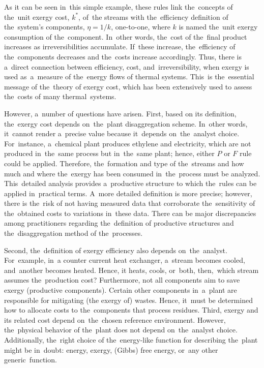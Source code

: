 \documentclass[energies,article,accept,moreauthors,pdftex]{Definitions/mdpi}
\begin{document}
As it can be seen in~this simple example, these rules link the~concepts of the~unit exergy cost, $k^*$, of~the streams with the~efficiency definition of the~system's components, $\eta= 1/k$, one-to-one, where $k$ is named the~unit exergy consumption of the~component. In~other words, the~cost of the~final product increases as irreversibilities accumulate. If~these increase, the~efficiency of the~components decreases and the~costs increase accordingly. Thus, there is a~direct connection between efficiency, cost, and~irreversibility, when exergy is used as~a~measure of the~energy flows of thermal systems. This~is the~essential message of the~theory of exergy cost, which has been extensively used to assess the~costs of many thermal~systems.

However, a~number of questions have arisen. First, based on its definition, the~exergy cost depends on~the~plant disaggregation scheme. In~other words, it~cannot render a~precise value because it~depends on~the~analyst choice. For~instance, a~chemical plant produces ethylene and electricity, which are not produced in~the~same process but in~the~same plant; hence, either $P$ or $F$ rule could be applied. Therefore, the~formation and type of the~streams and how much and where the~exergy has been consumed in~the~process must be analyzed. This~detailed analysis provides a~productive structure to which the~rules can be applied in~practical terms. A~more detailed definition is more precise; however, there is the~risk of not having measured data that corroborate the~sensitivity of the~obtained costs to variations in~these data. There can be major discrepancies among practitioners regarding the~definition of productive structures and the~disaggregation method of the~processes.

Second, the~definition of exergy efficiency also depends on~the~analyst. For~example, in~a counter current heat exchanger, a~stream becomes cooled, and~another becomes heated. Hence, it heats, cools, or~both, then,~which stream assumes the~production cost? Furthermore, not all components aim to save exergy (productive components). Certain other components in~a~plant are responsible for mitigating (the exergy of) wastes. Hence, it~must be determined how to allocate costs to the~components that process residues.
Third, exergy and its related cost depend on~the~chosen reference environment. However, the~physical behavior of the~plant does not depend on~the~analyst choice. Additionally, the~right choice of the~energy-like function for describing the~plant might be in~doubt: energy, exergy, (Gibbs) free energy, or~any other generic~function.
\end{document}
